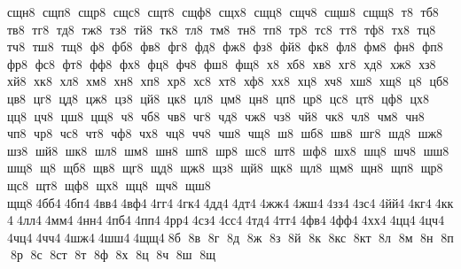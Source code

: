 сщн8  сщп8  сщр8  сщс8  сщт8  сщф8  сщх8  сщц8  сщч8  сщш8  сщщ8  т8  тб8  тв8  тг8  тд8  тж8  тз8  тй8  тк8  тл8  тм8  тн8  тп8  тр8  тс8  тт8  тф8  тх8  тц8  тч8  тш8  тщ8  ф8  фб8  фв8  фг8  фд8  фж8  фз8  фй8  фк8  фл8  фм8  фн8  фп8  фр8  фс8  фт8  фф8  фх8  фц8  фч8  фш8  фщ8  х8  хб8  хв8  хг8  хд8  хж8  хз8  хй8  хк8  хл8  хм8  хн8  хп8  хр8  хс8  хт8  хф8  хх8  хц8  хч8  хш8  хщ8  ц8  цб8  цв8  цг8  цд8  цж8  цз8  цй8  цк8  цл8  цм8  цн8  цп8  цр8  цс8  цт8  цф8  цх8  цц8  цч8  цш8  цщ8  ч8  чб8  чв8  чг8  чд8  чж8  чз8  чй8  чк8  чл8  чм8  чн8  чп8  чр8  чс8  чт8  чф8  чх8  чц8  чч8  чш8  чщ8  ш8  шб8  шв8  шг8  шд8  шж8  шз8  шй8  шк8  шл8  шм8  шн8  шп8  шр8  шс8  шт8  шф8  шх8  шц8  шч8  шш8  шщ8  щ8  щб8  щв8  щг8  щд8  щж8  щз8  щй8  щк8  щл8  щм8  щн8  щп8  щр8  щс8  щт8  щф8  щх8  щц8  щч8  щш8  щщ8 4бб4 4бп4 4вв4 4вф4 4гг4 4гк4 4дд4 4дт4 4жж4 4жш4 4зз4 4зс4 4йй4 4кг4 4кк4 4лл4 4мм4 4нн4 4пб4 4пп4 4рр4 4сз4 4сс4 4тд4 4тт4 4фв4 4фф4 4хх4 4цц4 4цч4 4чц4 4чч4 4шж4 4шш4 4щщ4 8б  8в  8г  8д  8ж  8з  8й  8к  8кс  8кт  8л  8м  8н  8п  8р  8с  8ст  8т  8ф  8х  8ц  8ч  8ш  8щ 